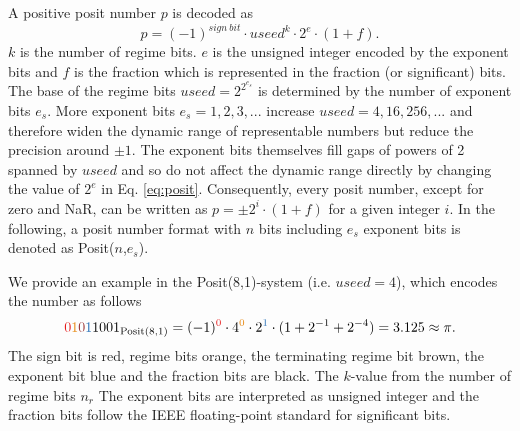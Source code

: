 \documentclass[draft]{agujournal2019}
\newcommand{\op}{\operatorname}
\begin{document}
A positive posit number $p$ is decoded as \cite{Gustafson2017,Gustafson2017a,Chen2018,Klower2019a}
\begin{equation}
p = (-1)^{sign~bit} \cdot useed^k \cdot 2^e \cdot (1+f).
\label{eq:posit}
\end{equation}
$k$ is the number of regime bits. $e$ is the unsigned integer encoded by the
exponent bits and $f$ is the fraction which is represented in the fraction
(or significant) bits. The base of the regime bits $useed = 2^{2^{e_s}}$ is
determined by the number of exponent bits $e_s$. More exponent bits $e_s=1,2,3,...$
increase $useed = 4,16,256,...$ and therefore widen the dynamic range of representable
numbers but reduce the precision around $\pm1$. The exponent bits themselves fill
gaps of powers of 2 spanned by $useed$ and so do not affect
the dynamic range directly by changing the value of $2^e$ in Eq. \ref{eq:posit}.
Consequently, every posit number, except for zero and NaR, can be written as
$p = \pm 2^i \cdot (1+f)$ for a given integer $i$. In the following,
a posit number format with $n$ bits including $e_s$ exponent bits
is denoted as Posit($n$,$e_s$).

We provide an example in the Posit(8,1)-system (i.e. $useed = 4$), which encodes
the number  as follows
\begin{equation}
{\color{psign}0}{\color{pregime}1}{\color{pregimet}0}{\color{pexpo}1}1001_{\op{Posit}(8,1)}
= (-1)^{\color{psign}0} \cdot 4^{\color{pregime}0} \cdot 2^{\color{pexpo}1}
\cdot (1+2^{-1}+2^{-4}) = 3.125 \approx \pi.
\label{eq:posit_pos}
\end{equation}
The sign bit is red, regime bits orange, the terminating regime bit brown, the
exponent bit blue and the fraction bits are black. The $k$-value
 from the number of regime bits $n_r$  The exponent bits are interpreted as unsigned integer and the fraction
bits follow the IEEE floating-point standard for significant bits.
\end{document}
